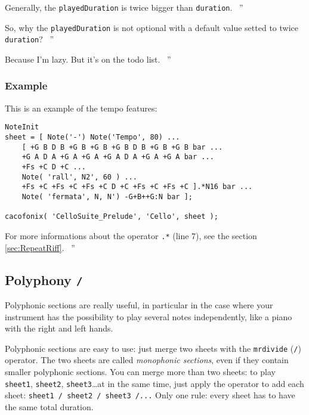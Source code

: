 \documentclass{article}
\newenvironment{meenv}{ \par \noindent \makebox[6em][r]{ \textcolor{mecolor}{Me}: `` --~}}{~''}
\newenvironment{myselfenv}{ \par \noindent \makebox[6em][r]{ \textcolor{myselfcolor}{Myself}: `` --~}}{~''}
\newcommand{ \me }[1]{%
\begin{meenv}%
	#1%
\end{meenv} }
\newcommand{ \myself }[1]{%
\begin{myselfenv}%
	#1%
\end{myselfenv} }
\begin{document}
\myself{Generally, the \lstinline!playedDuration! is twice bigger than \lstinline!duration!.}
\me{So, why the \lstinline!playedDuration! is not optional with a default value setted to twice \lstinline!duration!?}
\myself{Because I'm lazy. But it's on the todo list.}

\subsubsection{Example}

This is an example of the tempo features: \\

\begin{lstlisting}
NoteInit
sheet = [ Note('-') Note('Tempo', 80) ...
	[ +G B D B +G B +G B +G B D B +G B +G B bar ...
	+G A D A +G A +G A +G A D A +G A +G A bar ...
	+Fs +C D +C ...
	Note( 'rall', N2', 60 ) ...
	+Fs +C +Fs +C +Fs +C D +C +Fs +C +Fs +C ].*N16 bar ...
	Note( 'fermata', N, N') -G+B++G:N bar ];

cacofonix( 'CelloSuite_Prelude', 'Cello', sheet );
\end{lstlisting}

\myself{For more informations about the operator \lstinline!.*! (line 7), see the section \ref{sec:RepeatRiff}.}

\subsection{Polyphony \lstinline!/!}
\label{sec:Polyphony}

Polyphonic sections are really useful, in particular in the case where your instrument has the possibility to play several notes independently, like a piano with the right and left hands.

Polyphonic sections are easy to use: just merge two sheets with the \lstinline!mrdivide! (\lstinline!/!) operator. The two sheets are called \emph{monophonic sections}, even if they contain smaller polyphonic sections. You can merge more than two sheets: to play \lstinline!sheet1!, \lstinline!sheet2!, \lstinline!sheet3!\dots at in the same time, just apply the operator to add each sheet: \lstinline!sheet1 / sheet2 / sheet3 /...! Only one rule: every sheet has to have the same total duration.
\end{document}
